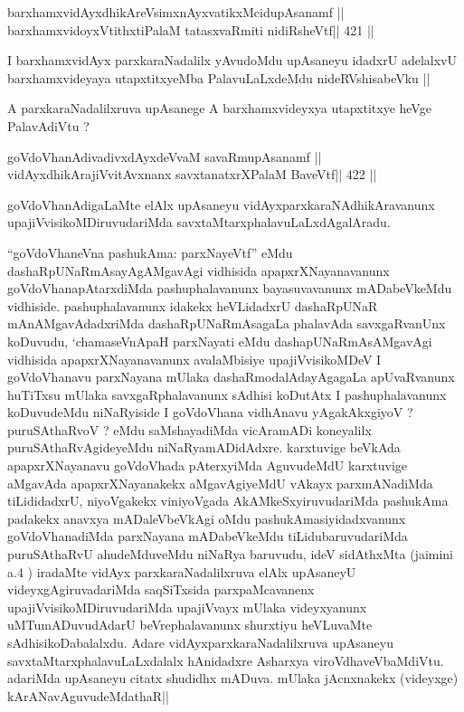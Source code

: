 \begin{shl}
barxhamxvidAyxdhikAreV\s simxnAyxvatikxMcidupAsanamf ||
barxhamxvidoyxVtithxtiPalaM tatasxvaRmiti nidiRsheVtf\hfill || 421 ||
\end{shl}

\begin{artha}
I barxhamxvidAyx parxkaraNadalilx yAvudoMdu upAsaneyu idadxrU
adelalxvU barxhamxvideyaya utapxtitxyeMba PalavuLaLxdeMdu
nideRVshisabeVku ||
\end{artha}

\begin{artha}
A parxkaraNadalilxruva upAsanege A barxhamxvideyxya utapxtitxye heVge
PalavAdiVtu ?
\end{artha}

\begin{shl}
goVdoVhanAdivadivxdAyxdeVvaM savaRmupAsanamf ||
vidAyxdhikArajiVvitAvxnanx savxtanatxrXPalaM BaveVtf\hfill || 422 ||
\end{shl}

\begin{artha}
goVdoVhanAdigaLaMte elAlx upAsaneyu vidAyxparxkaraNAdhikAravanunx
upajiVvisikoMDiruvudariMda savxtaMtarxphalavuLaLxdAgalAradu.
\end{artha}

\begin{artha}
``goVdoVhaneVna pashukAma: parxNayeVtf'' eMdu
  dashaRpUNaRmAsayAgAMgavAgi vidhisida apapxrXNayanavanunx
  goVdoVhanapAtarxdiMda pashuphalavanunx bayasuvavanunx mADabeVkeMdu
  vidhiside. pashuphalavanunx idakekx heVLidadxrU dashaRpUNaR
  mAnAMgavAdadxriMda dashaRpUNaRmAsagaLa phalavAda savxgaRvanUnx
  koDuvudu, `chamaseVnApaH parxNayati eMdu dashapUNaRmAsAMgavAgi
  vidhisida apapxrXNayanavanunx avalaMbisiye upajiVvisikoMDeV I
  goVdoVhanavu parxNayana mUlaka dashaRmodalAdayAgagaLa apUvaRvanunx
  huTiTxsu mUlaka savxgaRphalavanunx sAdhisi koDutAtx I
  pashuphalavanunx koDuvudeMdu niNaRyiside I goVdoVhana vidhAnavu
  yAgakAkxgiyoV ? puruSAthaRvoV ? eMdu saMshayadiMda vicAramADi
  koneyalilx puruSAthaRvAgideyeMdu niNaRyamADidAdxre. karxtuvige
  beVkAda apapxrXNayanavu goVdoVhada pAterxyiMda AguvudeMdU karxtuvige
  aMgavAda apapxrXNayanakekx aMgavAgiyeMdU vAkayx parxmANadiMda
  tiLididadxrU, niyoVgakekx viniyoVgada AkAMkeSxyiruvudariMda
  pashukAma padakekx anavxya mADaleVbeVkAgi oMdu
  pashukAmasiyidadxvanunx goVdoVhanadiMda parxNayana mADabeVkeMdu
  tiLidubaruvudariMda puruSAthaRvU ahudeMduveMdu niNaRya baruvudu,
  ideV sidAthxMta (jaimini a.4 ) iradaMte vidAyx parxkaraNadalilxruva
  elAlx upAsaneyU videyxgAgiruvadariMda saqSiTxsida parxpaMcavanenx
  upajiVvisikoMDiruvudariMda upajiVvayx mUlaka videyxyanunx
  uMTumADuvudAdarU beVrephalavanunx shurxtiyu heVLuvaMte
  sAdhisikoDabalalxdu. Adare vidAyxparxkaraNadalilxruva upAsaneyu
  savxtaMtarxphalavuLaLxdalalx hAnidadxre Asharxya
  viroVdhaveVbaMdiVtu. adariMda upAsaneyu citatx shudidhx
  mADuva. mUlaka jAcnxnakekx (videyxge) kArANavAguvudeMdathaR||
\end{artha}

